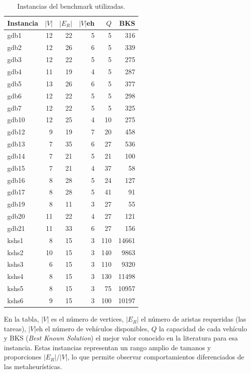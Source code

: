 \begin{table}[h]
\centering
\caption{Instancias del benchmark utilizadas.}
\label{tab:instancias}
\small
\begin{tabular}{lrrrrr}
\toprule
Instancia & $|V|$ & $|E_R|$ & $|V|$eh & $Q$ & BKS \\
\midrule
gdb1  & 12 & 22 & 5 &   5 &  316 \\
gdb2  & 12 & 26 & 6 &   5 &  339 \\
gdb3  & 12 & 22 & 5 &   5 &  275 \\
gdb4  & 11 & 19 & 4 &   5 &  287 \\
gdb5  & 13 & 26 & 6 &   5 &  377 \\
gdb6  & 12 & 22 & 5 &   5 &  298 \\
gdb7  & 12 & 22 & 5 &   5 &  325 \\
gdb10 & 12 & 25 & 4 &  10 &  275 \\
gdb12 & 9  & 19 & 7 &  20 &  458 \\
gdb13 & 7  & 35 & 6 &  27 &  536 \\
gdb14 & 7  & 21 & 5 &  21 &  100 \\
gdb15 & 7  & 21 & 4 &  37 &   58 \\
gdb16 & 8  & 28 & 5 &  24 &  127 \\
gdb17 & 8  & 28 & 5 &  41 &   91 \\
gdb19 & 8  & 11 & 3 &  27 &   55 \\
gdb20 & 11 & 22 & 4 &  27 &  121 \\
gdb21 & 11 & 33 & 6 &  27 &  156 \\
kshs1 & 8  & 15 & 3 & 110 & 14661 \\
kshs2 & 10 & 15 & 3 & 140 &  9863 \\
kshs3 & 6  & 15 & 3 & 110 &  9320 \\
kshs4 & 8  & 15 & 3 & 130 & 11498 \\
kshs5 & 8  & 15 & 3 &  75 & 10957 \\
kshs6 & 9  & 15 & 3 & 100 & 10197 \\
\bottomrule
\end{tabular}
\end{table}

En la tabla, $|V|$ es el número de vertices, $|E_R|$ el número de aristas
requeridas (las tareas), $|V|$eh el número de vehículos disponibles, $Q$
la capacidad de cada vehículo y BKS (\emph{Best Known Solution}) el
mejor valor conocido en la literatura para esa instancia. Estas
instancias representan un rango amplio de tamanos y proporciones
$|E_R|/|V|$, lo que permite observar comportamientos diferenciados de
las metaheurísticas.

